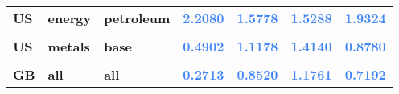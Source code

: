 \documentclass[
  authoryear,
  preprint,
  3p]{elsarticle}
\begin{document}
\begin{longtable}[t]{>{}l>{}l>{}l>{}r>{}r>{}r>{}r}
\textbf{US} & \textbf{energy} & \textbf{petroleum} & \textcolor[HTML]{4285f4}{\textbf{2.2080}} & \textcolor[HTML]{4285f4}{\textbf{1.5778}} & \textcolor[HTML]{4285f4}{\textbf{1.5288}} & \textcolor[HTML]{4285f4}{\textbf{1.9324}}\\
\textbf{\cellcolor{gray!10}{US}} & \textbf{\cellcolor{gray!10}{metals}} & \textbf{\cellcolor{gray!10}{all}} & \textcolor[HTML]{4285f4}{\textbf{\cellcolor{gray!10}{0.6320}}} & \textcolor[HTML]{4285f4}{\textbf{\cellcolor{gray!10}{1.1252}}} & \textcolor[HTML]{4285f4}{\textbf{\cellcolor{gray!10}{1.1212}}} & \textcolor[HTML]{4285f4}{\textbf{\cellcolor{gray!10}{0.9131}}}\\
\textbf{US} & \textbf{metals} & \textbf{base} & \textcolor[HTML]{4285f4}{\textbf{0.4902}} & \textcolor[HTML]{4285f4}{\textbf{1.1178}} & \textcolor[HTML]{4285f4}{\textbf{1.4140}} & \textcolor[HTML]{4285f4}{\textbf{0.8780}}\\
\addlinespace
\textbf{\cellcolor{gray!10}{US}} & \textbf{\cellcolor{gray!10}{metals}} & \textbf{\cellcolor{gray!10}{precious}} & \textcolor[HTML]{4285f4}{\textbf{\cellcolor{gray!10}{0.6674}}} & \textcolor[HTML]{4285f4}{\textbf{\cellcolor{gray!10}{1.1271}}} & \textcolor[HTML]{4285f4}{\textbf{\cellcolor{gray!10}{1.0480}}} & \textcolor[HTML]{4285f4}{\textbf{\cellcolor{gray!10}{0.9219}}}\\
\textbf{GB} & \textbf{all} & \textbf{all} & \textcolor[HTML]{4285f4}{\textbf{0.2713}} & \textcolor[HTML]{4285f4}{\textbf{0.8520}} & \textcolor[HTML]{4285f4}{\textbf{1.1761}} & \textcolor[HTML]{4285f4}{\textbf{0.7192}}\\
\bottomrule

\end{longtable}

\endgroup{}

\newpage
\end{document}
